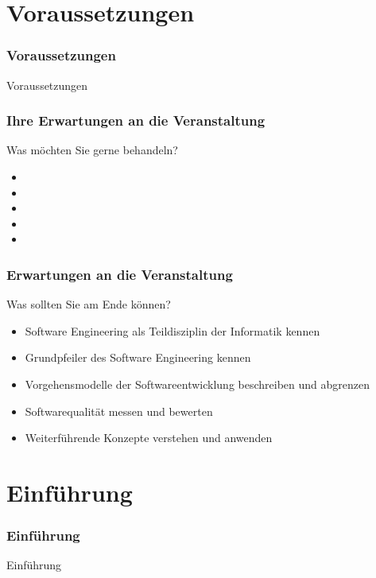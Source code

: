 
\section{Voraussetzungen}
\begin{frame}[fragile]
	\frametitle{Voraussetzungen}
\huge Voraussetzungen
\end{frame}

\begin{frame}
\frametitle{Ihre Erwartungen an die Veranstaltung}
	\begin{exampleblock}{Was m\"ochten Sie gerne behandeln?}
		\begin{itemize}
			 \item{}
			 \item{}
			 \item{}
			 \item{}
			 \item{}
		\end{itemize}
	\end{exampleblock}
\end{frame}

\begin{frame}
\frametitle{Erwartungen an die Veranstaltung}
	\begin{block}{Was sollten Sie am Ende k\"onnen?}
		\begin{itemize}
			 \item{Software Engineering als Teildisziplin der Informatik kennen}
			 \item{Grundpfeiler des Software Engineering kennen}
			 \item{Vorgehensmodelle der Softwareentwicklung beschreiben und abgrenzen}
			 \item{Softwarequalität messen und bewerten}
			 \item{Weiterf\"uhrende Konzepte verstehen und anwenden}
		\end{itemize}
	\end{block}
\end{frame}

\section{Einführung}
\begin{frame}[fragile]
	\frametitle{Einführung}
\huge Einführung
\end{frame}

